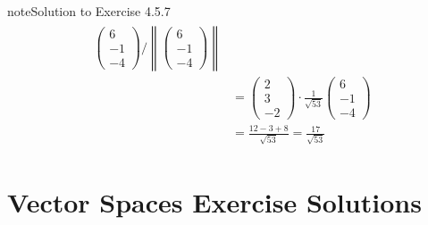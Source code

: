 \documentclass[letterpaper,10pt,english]{jupyterBook}
\begin{document}
\begin{sphinxadmonition}{note}{Solution to Exercise 4.5.7}
\begin{equation*}
\begin{split}
\begin{align*}
    \begin{pmatrix} 6 \\ -1 \\ -4 \end{pmatrix} / \left\|
    \begin{pmatrix} 6 \\ -1 \\ -4 \end{pmatrix} \right\| \\
    &= \begin{pmatrix} 2 \\ 3 \\ -2 \end{pmatrix} \cdot \frac{1}{\sqrt{53}} 
    \begin{pmatrix} 6 \\ -1 \\ -4 \end{pmatrix} \\
    &= \frac{12 - 3 + 8}{\sqrt{53}} = \frac{17}{\sqrt{53}}
\end{align*} \end{split}
\end{equation*}\end{sphinxadmonition}

\sphinxstepscope


\chapter{Vector Spaces Exercise Solutions}
\label{\detokenize{_pages/A5_Vector_spaces_exercises_solutions:vector-spaces-exercise-solutions}}\label{\detokenize{_pages/A5_Vector_spaces_exercises_solutions:vector-spaces-exercises-solutions-section}}\label{\detokenize{_pages/A5_Vector_spaces_exercises_solutions::doc}} \label{_pages/A5_Vector_spaces_exercises_solutions:_pages/A5_Vector_spaces_exercises_solutions-solution-0}
\end{document}
